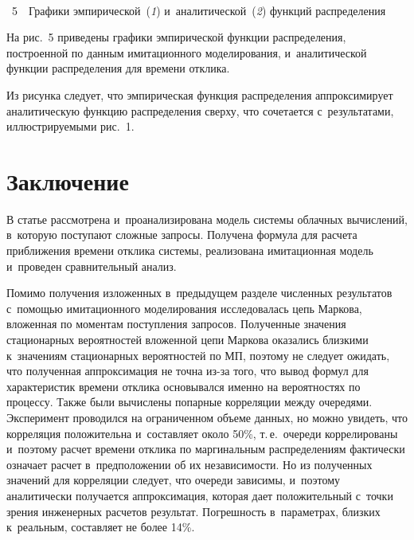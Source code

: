 \begin{multicols}{2}
\begin{center}  %
\vspace*{-1pt}
 \mbox{%
 \epsfxsize=78.908mm
 }

\end{center}

\vspace*{-6pt}

\noindent
{{\figurename~5}\ \ \small{Графики эмпирической~(\textit{1}) и~аналитической~(\textit{2}) функций 
распределения}}
 
 \vspace*{15pt}
  

  
  На рис.~5 приведены графики эмпирической функции распределения, 
построенной по данным имитационного моделирования, и~аналитической 
функции распределения для времени отклика. 

Из рисунка следует, что 
эмпирическая функция распределения аппроксимирует аналитическую 
функцию распределения сверху, что сочетается с~результатами, 
иллюстрируемыми рис.~1.
  
\section{Заключение}

  В статье рассмотрена и~проанализирована модель системы облачных 
вычислений, в~которую поступают сложные запросы. Получена формула для 
расчета приближения времени отклика системы, реализована имитационная 
модель и~проведен сравнительный анализ.
  
  Помимо получения изложенных в~предыдущем разделе численных 
результатов с~помощью имитационного моделирования исследовалась цепь\linebreak 
Маркова, вложенная по моментам поступления запросов. Полученные 
значения стационарных вероятностей вложенной цепи Маркова оказались близкими 
к~значениям стационарных вероятностей по МП, поэтому не следует ожидать, 
что полученная аппроксимация не точна из-за того, что вывод формул для 
характеристик времени отклика основывался именно на вероятностях по 
процессу. Также были вычислены попарные корреляции между очередями. 
Эксперимент проводился на ограниченном объеме данных, но можно увидеть, 
что корреляция положительна и~составляет около 50\%, т.\,е.\ очереди 
коррелированы и~поэтому расчет времени отклика по маргинальным 
распределениям фактически означает расчет в~предположении об их 
независимости. Но из полученных значений для корреляции следует, что 
очереди зависимы, и~поэтому аналитически получается аппроксимация, которая 
дает положительный с~точки зрения инженерных расчетов результат. 
Погрешность в~параметрах, близких к~реальным, составляет не более 14\%.
  

\end{multicols}
